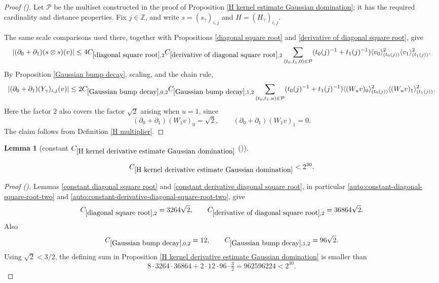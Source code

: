 \documentclass[12pt,reqno]{amsart}
\newcommand{\auto}{{({\tiny\faCar})}}
\theoremstyle{plain}
\newtheorem{lemma}[theorem]{Lemma}
\numberwithin{equation}{section}
\theoremstyle{remark}
\newcommand{\uses}[1]{}
\newcommand{\usesdefs}[1]{}
\newcommand{\leanok}{}
\newcommand{\lean}[1]{}
\newcommand{\Z}{{\mathbb Z}}
\begin{document}
\begin{proof}[Proof \auto]
Let $\mathcal P$ be the multiset constructed in the proof of
Proposition \ref{H kernel estimate Gaussian domination}; it has the
required cardinality and distance properties. Fix $j\in\Z$, and write
$s=(s_\gamma)_{i,j}$ and $H=(H_\gamma)_{i,j}$.

The same scale comparisons used there, together with Propositions
\ref{diagonal square root} and
\ref{derivative of diagonal square root}, give
\[
|(\partial_0+\partial_1)(s\otimes s)(v)|
\le
4C_{\ref{diagonal square root},2}
C_{\ref{derivative of diagonal square root},2}
\sum_{(t_0,t_1,0)\in\mathcal P}
(t_0(j)^{-1}+t_1(j)^{-1})
\langle v_0\rangle_{(t_0(j))}^2
\langle v_1\rangle_{(t_1(j))}^2.
\]
By Proposition \ref{Gaussian bump decay}, scaling, and the chain rule,
\[
|(\partial_0+\partial_1)(Y_\gamma)_{i,j}(v)|
\le
2C_{\ref{Gaussian bump decay},0,2}
C_{\ref{Gaussian bump decay},1,2}
\sum_{(t_0,t_1,u)\in\mathcal P}
(t_0(j)^{-1}+t_1(j)^{-1})
\langle (W_uv)_0\rangle_{(t_0(j))}^2
\langle (W_uv)_1\rangle_{(t_1(j))}^2.
\]
Here the factor $2$ also covers the factor $\sqrt2$ arising when
$u=1$, since
\[
(\partial_0+\partial_1)(W_1v)_0=\sqrt2,
\qquad
(\partial_0+\partial_1)(W_1v)_1=0.
\]
The claim follows from Definition \ref{H multiplier}.
\end{proof}

\begin{lemma}[constant $C_{\ref{H kernel derivative estimate Gaussian domination}}$ \auto]\label{constant H kernel derivative estimate Gaussian domination}
\lean{Auto.constantHKernelDerivativeEstimateGaussianDomination}
\leanok
\uses{constant diagonal square root,constant derivative diagonal square root,diagonal square root,derivative of diagonal square root,Gaussian bump decay,H kernel derivative estimate Gaussian domination}\usesdefs{}
\begin{equation}\label{constant H kernel derivative estimate Gaussian domination bound}
C_{\ref{H kernel derivative estimate Gaussian domination}}
<2^{30}.
\end{equation}
\end{lemma}
\begin{proof}[Proof \auto]
Lemmas \ref{constant diagonal square root} and \ref{constant derivative diagonal square root}, in particular \eqref{auto:constant-diagonal-square-root-two} and \eqref{auto:constant-derivative-diagonal-square-root-two}, give
\[
C_{\ref{diagonal square root},2}=3264\sqrt2,
\qquad
C_{\ref{derivative of diagonal square root},2}=36864\sqrt2.
\]
Also
\[
C_{\ref{Gaussian bump decay},0,2}=12,
\qquad
C_{\ref{Gaussian bump decay},1,2}=96\sqrt2.
\]
Using $\sqrt2<3/2$, the defining sum in Proposition \ref{H kernel derivative estimate Gaussian domination} is smaller than
\[
8\cdot3264\cdot36864+2\cdot12\cdot96\cdot\tfrac32
=962596224<2^{30}.
\]
\end{proof}
\end{document}
